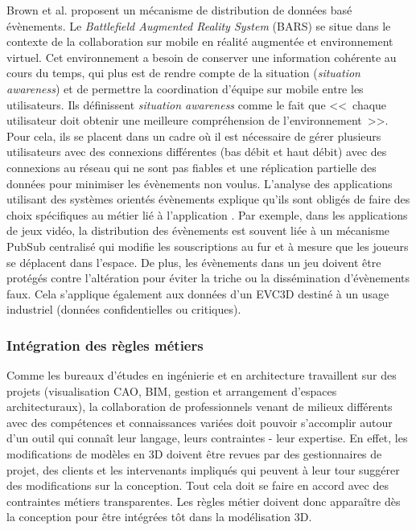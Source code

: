 Brown et al. \cite{Brown2003} proposent un mécanisme de distribution de 
données basé évènements. Le \textit{Battlefield Augmented Reality System} 
(BARS) se situe dans le contexte de la collaboration sur mobile en réalité 
augmentée et environnement virtuel. Cet environnement a besoin de conserver 
une information cohérente au cours du temps, qui plus est de rendre compte de la 
situation (\textit{situation awareness}) et de permettre la coordination d'équipe sur 
mobile entre les utilisateurs. Ils définissent \textit{situation awareness} comme le 
fait que <<~chaque utilisateur doit obtenir une meilleure compréhension de 
l'environnement~>>. Pour cela, ils se placent dans un cadre où il est nécessaire 
de gérer plusieurs utilisateurs avec des connexions différentes (bas débit et haut 
débit) avec des connexions au réseau qui ne sont pas fiables et une réplication 
partielle des données pour minimiser les évènements non voulus.
 L'analyse des applications utilisant des 
systèmes orientés évènements explique 
qu'ils sont obligés de faire des choix spécifiques au métier lié à l'application 
\cite{Hinze2009}. Par exemple, dans les applications de jeux vidéo, la distribution 
des évènements est souvent liée à un mécanisme \gls{PubSub} centralisé qui 
modifie les souscriptions au fur et à mesure que les joueurs se déplacent dans 
l'espace. De plus, les évènements dans un jeu doivent être protégés contre 
l'altération pour éviter la triche ou la dissémination d'évènements faux. Cela 
s'applique également aux données d'un \gls{EVC3D} destiné à un usage industriel 
(données confidentielles ou critiques).

\subsubsection{Intégration des règles métiers}
Comme les bureaux d'études en ingénierie et en architecture travaillent sur des 
projets (visualisation \gls{CAO}, \gls{BIM}, gestion et arrangement d'espaces 
architecturaux), la collaboration de professionnels venant de milieux différents 
avec des compétences et connaissances variées doit pouvoir s'accomplir autour d'un 
outil qui connaît leur langage, leurs contraintes - leur expertise. En effet, les 
modifications de modèles en \gls{3D} doivent être revues par des gestionnaires de 
projet, des clients et les intervenants impliqués qui peuvent à leur tour suggérer 
des modifications sur la conception. Tout cela doit se faire en accord avec des 
contraintes métiers transparentes.
Les règles métier doivent donc apparaître dès la conception pour être 
intégrées tôt dans la modélisation 3D. 

